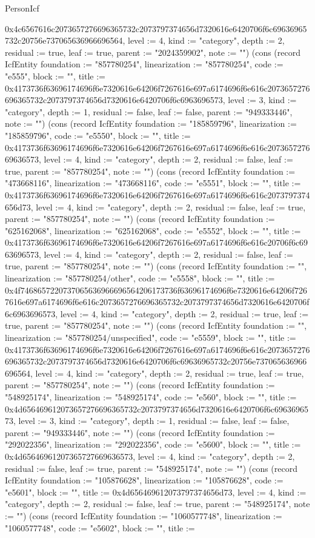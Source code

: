 \begin{lexlean}{PersonIcf}
\begin{semanticmodule}
{0x4c6567616c2073657276696365732c2073797374656d7320616e6420706f6c69636965732c20756e737065636966696564, level := 4, kind := "category", depth := 2, residual := true, leaf := true, parent := "2024359902", note := ""}) (cons (record IcfEntity {foundation := "857780254", linearization := "857780254", code := "e555", block := "", title := 0x4173736f63696174696f6e7320616e64206f7267616e697a6174696f6e616c2073657276696365732c2073797374656d7320616e6420706f6c6963696573, level := 3, kind := "category", depth := 1, residual := false, leaf := false, parent := "949333446", note := ""}) (cons (record IcfEntity {foundation := "185859796", linearization := "185859796", code := "e5550", block := "", title := 0x4173736f63696174696f6e7320616e64206f7267616e697a6174696f6e616c207365727669636573, level := 4, kind := "category", depth := 2, residual := false, leaf := true, parent := "857780254", note := ""}) (cons (record IcfEntity {foundation := "473668116", linearization := "473668116", code := "e5551", block := "", title := 0x4173736f63696174696f6e7320616e64206f7267616e697a6174696f6e616c2073797374656d73, level := 4, kind := "category", depth := 2, residual := false, leaf := true, parent := "857780254", note := ""}) (cons (record IcfEntity {foundation := "625162068", linearization := "625162068", code := "e5552", block := "", title := 0x4173736f63696174696f6e7320616e64206f7267616e697a6174696f6e616c20706f6c6963696573, level := 4, kind := "category", depth := 2, residual := false, leaf := true, parent := "857780254", note := ""}) (cons (record IcfEntity {foundation := "", linearization := "857780254/other", code := "e5558", block := "", title := 0x4f7468657220737065636966696564206173736f63696174696f6e7320616e64206f7267616e697a6174696f6e616c2073657276696365732c2073797374656d7320616e6420706f6c6963696573, level := 4, kind := "category", depth := 2, residual := true, leaf := true, parent := "857780254", note := ""}) (cons (record IcfEntity {foundation := "", linearization := "857780254/unspecified", code := "e5559", block := "", title := 0x4173736f63696174696f6e7320616e64206f7267616e697a6174696f6e616c2073657276696365732c2073797374656d7320616e6420706f6c69636965732c20756e737065636966696564, level := 4, kind := "category", depth := 2, residual := true, leaf := true, parent := "857780254", note := ""}) (cons (record IcfEntity {foundation := "548925174", linearization := "548925174", code := "e560", block := "", title := 0x4d656469612073657276696365732c2073797374656d7320616e6420706f6c6963696573, level := 3, kind := "category", depth := 1, residual := false, leaf := false, parent := "949333446", note := ""}) (cons (record IcfEntity {foundation := "292022356", linearization := "292022356", code := "e5600", block := "", title := 0x4d65646961207365727669636573, level := 4, kind := "category", depth := 2, residual := false, leaf := true, parent := "548925174", note := ""}) (cons (record IcfEntity {foundation := "105876628", linearization := "105876628", code := "e5601", block := "", title := 0x4d656469612073797374656d73, level := 4, kind := "category", depth := 2, residual := false, leaf := true, parent := "548925174", note := ""}) (cons (record IcfEntity {foundation := "1060577748", linearization := "1060577748", code := "e5602", block := "", title := }
\end{semanticmodule}
\end{lexlean}
